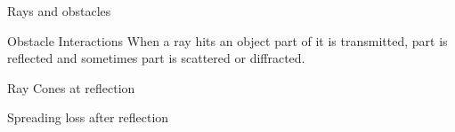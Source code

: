 \documentclass[8pt]{beamer}
\begin{document}
\begin{frame}{Rays and obstacles}
\begin{block}{Obstacle Interactions}
When a ray hits an object part of it is transmitted, part is reflected and sometimes part is scattered or diffracted.
\begin{minipage}{\linewidth}
\begin{minipage}{0.27\linewidth}
\rayeffectreflection \footnotemark[1]
\end{minipage}
\begin{minipage}{0.21\linewidth}
\rayeffectscattering  
\footnotemark[2]
\end{minipage}
\begin{minipage}{0.18\linewidth}
\rayeffecttransmission
\end{minipage}
\begin{minipage}{0.29\linewidth}
\rayeffectroughness \footnotemark[1]
\end{minipage}
\end{minipage}
\end{block}
\end{frame}
\begin{frame}{Ray Cones at reflection}
\begin{block}{Spreading loss after reflection}
\begin{minipage}{0.45\linewidth}
\standardcone
\end{minipage}
\begin{minipage}{0.45\linewidth}
\standardconetwo
\end{minipage}
\end{block}
\end{frame}
\end{document}
